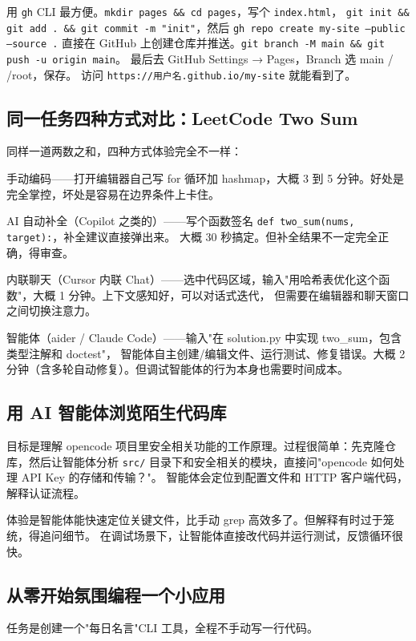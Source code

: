 \documentclass[a4paper,11pt]{ctexart}
\begin{document}
用 \texttt{gh} CLI 最方便。\texttt{mkdir pages \&\& cd pages}，写个 \texttt{index.html}，
\texttt{git init \&\& git add . \&\& git commit -m "init"}，然后 \texttt{gh repo create my-site --public --source .}
直接在 GitHub 上创建仓库并推送。\texttt{git branch -M main \&\& git push -u origin main}。
最后去 GitHub Settings → Pages，Branch 选 main / /root，保存。
访问 \texttt{https://用户名.github.io/my-site} 就能看到了。

\subsection{同一任务四种方式对比：LeetCode Two Sum}

同样一道两数之和，四种方式体验完全不一样：

手动编码——打开编辑器自己写 for 循环加 hashmap，大概 3 到 5 分钟。好处是完全掌控，坏处是容易在边界条件上卡住。

AI 自动补全（Copilot 之类的）——写个函数签名 \texttt{def two\_sum(nums, target):}，补全建议直接弹出来。
大概 30 秒搞定。但补全结果不一定完全正确，得审查。

内联聊天（Cursor 内联 Chat）——选中代码区域，输入"用哈希表优化这个函数"，大概 1 分钟。上下文感知好，可以对话式迭代，
但需要在编辑器和聊天窗口之间切换注意力。

智能体（aider / Claude Code）——输入"在 solution.py 中实现 two\_sum，包含类型注解和 doctest"，
智能体自主创建/编辑文件、运行测试、修复错误。大概 2 分钟（含多轮自动修复）。但调试智能体的行为本身也需要时间成本。

\subsection{用 AI 智能体浏览陌生代码库}

目标是理解 opencode 项目里安全相关功能的工作原理。过程很简单：先克隆仓库，然后让智能体分析 \texttt{src/}
目录下和安全相关的模块，直接问"opencode 如何处理 API Key 的存储和传输？"。
智能体会定位到配置文件和 HTTP 客户端代码，解释认证流程。

体验是智能体能快速定位关键文件，比手动 grep 高效多了。但解释有时过于笼统，得追问细节。
在调试场景下，让智能体直接改代码并运行测试，反馈循环很快。

\subsection{从零开始氛围编程一个小应用}

任务是创建一个"每日名言"CLI 工具，全程不手动写一行代码。
\end{document}
